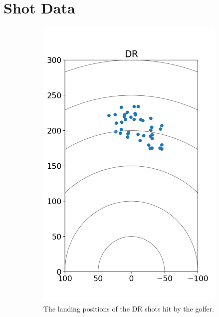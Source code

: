 \documentclass{kththesis}
\begin{document}
\chapter{Shot Data}
\label{app:shot_data}
\begin{figure}
    \centering
    \begin{subfigure}{0.4\textwidth}
    \centering
    \includegraphics[height=0.4\textheight]{Shots/DR_shots.png} 
    \caption{The landing positions of the DR shots hit by the golfer.}
    \label{fig:DR_shots}
    \end{subfigure}
    \begin{subfigure}{0.4\textwidth}
    \centering

\end{subfigure}
\end{figure}
\end{document}
